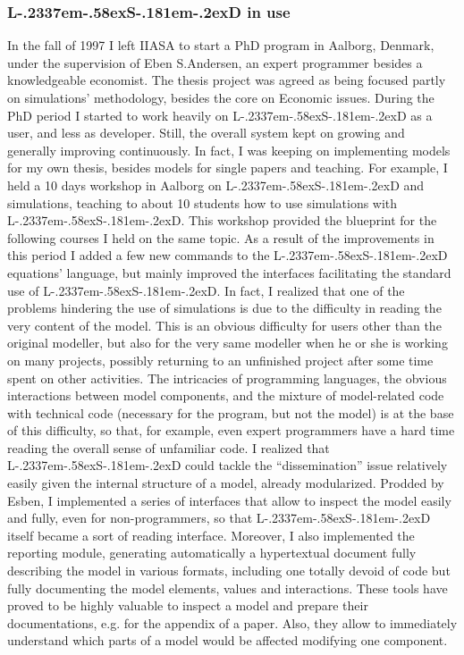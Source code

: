 \documentclass [11pt,a4paper] {book}
\def\LsD{{L\kern-.2337em\lower-.58ex\hbox{S}\kern-.181em\lower-.2ex\hbox{D}}\xspace}
\begin{document}
\subsubsection{\LsD in use}
In the fall of 1997 I left IIASA to start a PhD program in Aalborg, Denmark, under the supervision of Eben S.Andersen, an expert programmer besides a knowledgeable economist. The thesis project was agreed as being focused partly on simulations' methodology, besides the core on Economic issues. During the PhD period I started to work heavily on \LsD as a user, and less as developer. Still, the overall system kept on growing and generally improving continuously. In fact, I was keeping on implementing models for my own thesis, besides models for single papers and teaching. For example, I held a 10 days workshop in Aalborg on \LsD and simulations, teaching to about 10 students how to use simulations with \LsD. This workshop provided the blueprint for the following courses I held on the same topic. As a result of the improvements in this period I added a few new commands to the \LsD equations' language, but mainly improved the interfaces facilitating the standard use of \LsD. In fact, I realized that one of the problems hindering the use of simulations is due to the difficulty in reading the very content of the model. This is an obvious difficulty for users other than the original modeller, but also for the very same modeller when he or she is working on many projects, possibly returning to an unfinished project after some time spent on other activities. The intricacies of programming languages, the obvious interactions between model components, and the mixture of model-related code with technical code (necessary for the program, but not the model) is at the base of this difficulty, so that, for example, even expert programmers have a hard time reading the overall sense of unfamiliar code. I realized that \LsD could tackle the ``dissemination'' issue relatively easily given the internal structure of a model, already modularized. Prodded by Esben, I implemented a series of interfaces that allow to inspect the model easily and fully, even for non-programmers, so that \LsD itself became a sort of reading interface. Moreover, I also implemented the reporting module, generating automatically a hypertextual document fully describing the model in various formats, including one totally devoid of code but fully documenting the model elements, values and interactions. These tools have proved to be highly valuable to inspect a model and prepare their documentations, e.g. for the appendix of a paper. Also, they allow to immediately understand which parts of a model would be affected modifying one component.
\end{document}
